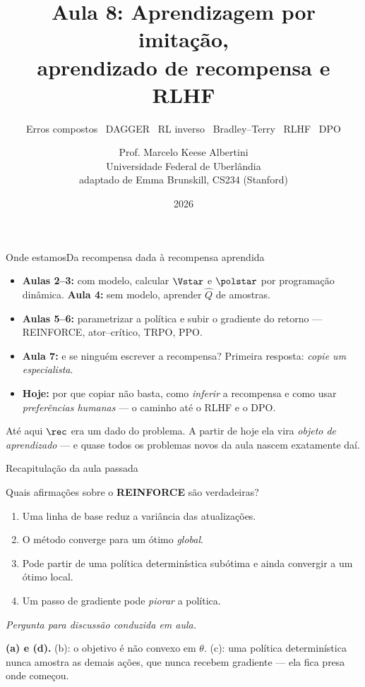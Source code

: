 \documentclass[aspectratio=169, 11pt]{beamer}
\title[Aula 8 — Imitação, recompensa e RLHF]{Aula 8: Aprendizagem por imitação,\\ aprendizado de recompensa e RLHF}
\subtitle[Aprendizagem por Reforço]{Erros compostos \textbullet\ DAGGER \textbullet\ RL inverso \textbullet\ Bradley--Terry \textbullet\ RLHF \textbullet\ DPO}
\author[Prof. Marcelo K. Albertini]{Prof. Marcelo Keese Albertini \\
  \footnotesize Universidade Federal de Uberlândia \\
  \footnotesize adaptado de Emma Brunskill, CS234 (Stanford)}
\institute{Universidade Federal de Uberlândia}
\date{2026}
\newcommand{\paradiscussao}{\smallskip
  {\footnotesize\color{rlCinza}\itshape Pergunta para discussão conduzida em aula.}}
\newcommand{\thv}{\theta}
\newcommand{\Qhat}{\hat{Q}}
\begin{document}
\begin{frame}\titlepage\end{frame}

\begin{frame}{Onde estamos}{Da recompensa dada à recompensa aprendida}

  \begin{itemize}\setlength{\itemsep}{0.45ex}
    \item \textbf{Aulas 2--3:} com modelo, calcular $\Vstar$ e $\polstar$ por
      programação dinâmica. \textbf{Aula 4:} sem modelo, aprender $\Qhat$ de
      amostras.
    \item \textbf{Aulas 5--6:} parametrizar a política e subir o gradiente do
      retorno --- REINFORCE, ator--crítico, TRPO, PPO.
    \item \textbf{Aula 7:} e se ninguém escrever a recompensa? Primeira resposta:
      \emph{copie um especialista}.
    \item \textbf{Hoje:} por que copiar não basta, como \emph{inferir} a
      recompensa e como usar \emph{preferências humanas} --- o caminho até o
      RLHF e o DPO.
  \end{itemize}

  \begin{ideiabox}
    Até aqui $\rec$ era um dado do problema. A partir de hoje ela vira
    \emph{objeto de aprendizado} --- e quase todos os problemas novos da aula
    nascem exatamente daí.
  \end{ideiabox}
\end{frame}

\begin{frame}{Recapitulação da aula passada}

  \begin{quizbox}{}
    Quais afirmações sobre o \textbf{REINFORCE} são verdadeiras?
    \begin{enumerate}\setlength{\itemsep}{0ex}
      \item[(a)] Uma linha de base reduz a variância das atualizações.
      \item[(b)] O método converge para um ótimo \emph{global}.
      \item[(c)] Pode partir de uma política determinística subótima e ainda
        convergir a um ótimo local.
      \item[(d)] Um passo de gradiente pode \emph{piorar} a política.
    \end{enumerate}
    \vspace{-0.3em}\paradiscussao
  \end{quizbox}

  \pause

  \begin{respbox}
    \textbf{(a) e (d).} \;(b): o objetivo é não convexo em $\thv$. \;(c): uma
    política determinística nunca amostra as demais ações, que nunca recebem
    gradiente --- ela fica presa onde começou.
  \end{respbox}
\end{frame}
\end{document}
